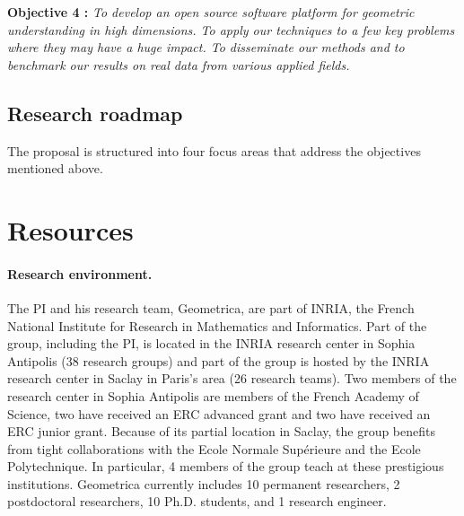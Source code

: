 {\bf Objective 4 :}   {\em To develop an open source {\em  software platform for geometric understanding in high dimensions}. %
To apply our techniques to a few key problems where they may have a huge impact. To disseminate our methods and to benchmark our results on real data from various applied fields.}

\subsection{Research roadmap} 


%


The proposal is structured into four focus areas that address the objectives mentioned above.









\section{Resources}

\paragraph{Research environment.}
The PI and his research team, Geometrica, are part of INRIA, the French National Institute for Research in Mathematics and Informatics. Part of the group, including the PI, is located in the INRIA research center in Sophia Antipolis  (38 research groups) and part of the group is hosted by the INRIA research center in Saclay in Paris's area (26 research teams). Two members of the research center in Sophia Antipolis are members of the French Academy of Science, two have received an ERC advanced grant and two have received an ERC junior grant. Because of its partial location in Saclay, the group benefits from tight collaborations with the Ecole Normale Sup\'erieure and the Ecole Polytechnique. In particular, 4 members of the group teach at these prestigious institutions. Geometrica currently includes 10 permanent researchers,  2 postdoctoral researchers, 10 Ph.D. students, and 1 research engineer. 

